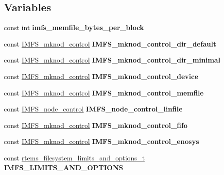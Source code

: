 \subsection*{Variables}
\begin{DoxyCompactItemize}
\item 
\mbox{\label{group__IMFS_ga71ecf884b5d8beebb94da7ad99af80fb}} 
const int {\bfseries imfs\+\_\+memfile\+\_\+bytes\+\_\+per\+\_\+block}
\item 
\mbox{\label{group__IMFS_ga6b559a9ae1f99c074bb17bf87ab95c7e}} 
const \mbox{\hyperlink{structIMFS__mknod__control}{I\+M\+F\+S\+\_\+mknod\+\_\+control}} {\bfseries I\+M\+F\+S\+\_\+mknod\+\_\+control\+\_\+dir\+\_\+default}
\item 
\mbox{\label{group__IMFS_ga6e0c4d591e1158ef66593ae681789989}} 
const \mbox{\hyperlink{structIMFS__mknod__control}{I\+M\+F\+S\+\_\+mknod\+\_\+control}} {\bfseries I\+M\+F\+S\+\_\+mknod\+\_\+control\+\_\+dir\+\_\+minimal}
\item 
\mbox{\label{group__IMFS_ga59b4573226fbadb9316ef41f40eb2de5}} 
const \mbox{\hyperlink{structIMFS__mknod__control}{I\+M\+F\+S\+\_\+mknod\+\_\+control}} {\bfseries I\+M\+F\+S\+\_\+mknod\+\_\+control\+\_\+device}
\item 
\mbox{\label{group__IMFS_ga0549d793dfcc642b471a83e281ccc71b}} 
const \mbox{\hyperlink{structIMFS__mknod__control}{I\+M\+F\+S\+\_\+mknod\+\_\+control}} {\bfseries I\+M\+F\+S\+\_\+mknod\+\_\+control\+\_\+memfile}
\item 
\mbox{\label{group__IMFS_ga8625bf494ba93ab06f2a5b17e7276512}} 
const \mbox{\hyperlink{structIMFS__node__control}{I\+M\+F\+S\+\_\+node\+\_\+control}} {\bfseries I\+M\+F\+S\+\_\+node\+\_\+control\+\_\+linfile}
\item 
\mbox{\label{group__IMFS_ga6fa4a4d42a2390828a811b3b7c36e719}} 
const \mbox{\hyperlink{structIMFS__mknod__control}{I\+M\+F\+S\+\_\+mknod\+\_\+control}} {\bfseries I\+M\+F\+S\+\_\+mknod\+\_\+control\+\_\+fifo}
\item 
\mbox{\label{group__IMFS_gad800cea2989c2d7fd0bf433c04734396}} 
const \mbox{\hyperlink{structIMFS__mknod__control}{I\+M\+F\+S\+\_\+mknod\+\_\+control}} {\bfseries I\+M\+F\+S\+\_\+mknod\+\_\+control\+\_\+enosys}
\item 
\mbox{\label{group__IMFS_ga870ec4d0a5d03cb5dcd0884d92af4010}} 
const \mbox{\hyperlink{structrtems__filesystem__limits__and__options__t}{rtems\+\_\+filesystem\+\_\+limits\+\_\+and\+\_\+options\+\_\+t}} {\bfseries I\+M\+F\+S\+\_\+\+L\+I\+M\+I\+T\+S\+\_\+\+A\+N\+D\+\_\+\+O\+P\+T\+I\+O\+NS}
\end{DoxyCompactItemize}
